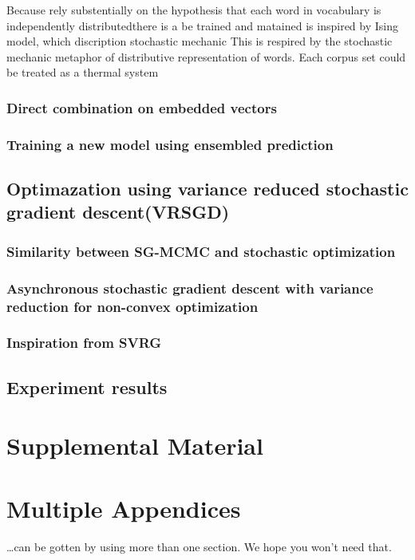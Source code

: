 \documentclass[11pt,a4paper]{article}
\begin{document}
Because  rely substentially on the hypothesis that each word in vocabulary is independently distributedthere is a be trained and matained is inspired by Ising model, which discription stochastic mechanic This is respired by the stochastic mechanic metaphor of distributive representation of words. Each corpus set could be treated as a thermal system 
\subsubsection{Direct combination on embedded vectors}
\subsubsection{Training a new model using ensembled prediction}

\subsection{Optimazation using variance reduced stochastic gradient descent(VRSGD)}
\subsubsection{Similarity between SG-MCMC and stochastic optimization}
\subsubsection{Asynchronous stochastic gradient descent with variance reduction for non-convex optimization}
\subsubsection{Inspiration from SVRG}
\subsection{Experiment results}




\appendix

\section{Supplemental Material}
\label{sec:supplemental}

\section{Multiple Appendices}
\dots can be gotten by using more than one section. We hope you won't
need that.
\end{document}
